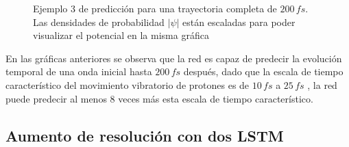 \begin{figure}[H]
  \centering
  \caption{Ejemplo 3 de predicción para una trayectoria completa de $200\,fs$.\\ Las densidades de probabilidad $|\psi|$ están escaladas para poder visualizar el potencial en la misma gráfica}
  \label{fig:trajec3}
\end{figure}

En las gráficas anteriores se observa que la red es capaz de predecir la evolución temporal de una onda inicial hasta $200\,fs$ después, dado que la escala de tiempo característico del movimiento vibratorio de protones es de $10\,fs$ a $25\,fs$ \cite{Main:2021}, la red puede predecir al menos 8 veces más esta escala de tiempo característico.  


\subsection{Aumento de resolución con dos LSTM}


